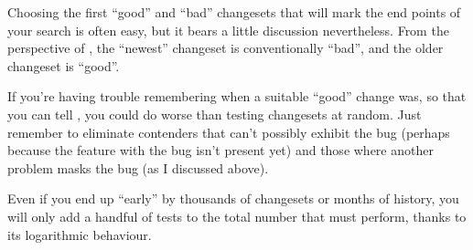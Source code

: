 Choosing the first ``good'' and ``bad'' changesets that will mark the
end points of your search is often easy, but it bears a little
discussion nevertheless.  From the perspective of , the
``newest'' changeset is conventionally ``bad'', and the older
changeset is ``good''.

If you're having trouble remembering when a suitable ``good'' change
was, so that you can tell , you could do worse than
testing changesets at random.  Just remember to eliminate contenders
that can't possibly exhibit the bug (perhaps because the feature with
the bug isn't present yet) and those where another problem masks the
bug (as I discussed above).

Even if you end up ``early'' by thousands of changesets or months of
history, you will only add a handful of tests to the total number that
 must perform, thanks to its logarithmic behaviour.

